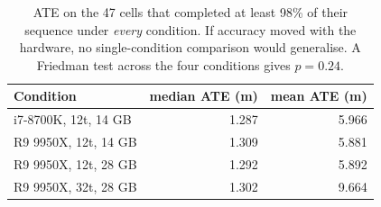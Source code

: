 \begin{table}[H]
\centering
\caption{ATE on the 47 cells that completed at least 98\% of their sequence under \emph{every} condition. If accuracy moved with the hardware, no single-condition comparison would generalise. A Friedman test across the four conditions gives $p=0.24$.}
\label{tab:hw-invariance}
\small
\begin{tabular}{@{}lrr@{}}
\toprule
Condition & median ATE (m) & mean ATE (m) \\
\midrule
i7-8700K, 12t, 14 GB & 1.287 & 5.966 \\
R9 9950X, 12t, 14 GB & 1.309 & 5.881 \\
R9 9950X, 12t, 28 GB & 1.292 & 5.892 \\
R9 9950X, 32t, 28 GB & 1.302 & 9.664 \\
\bottomrule
\end{tabular}
\end{table}
